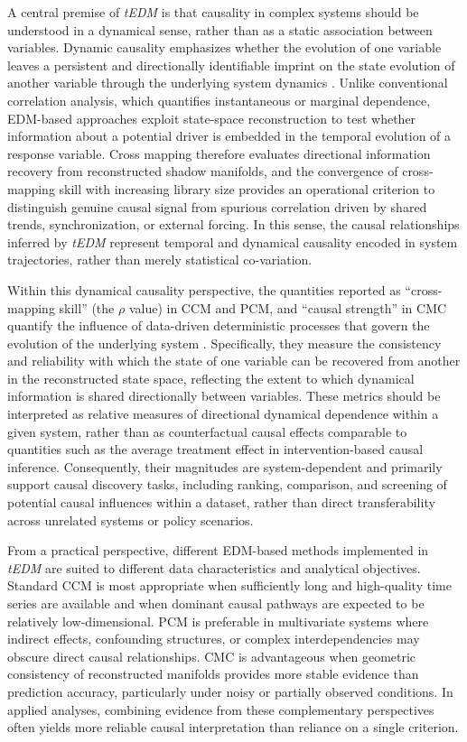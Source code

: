 \documentclass[authoryear,preprint,review,12pt]{elsarticle}
\begin{document}
A central premise of \textit{tEDM} is that causality in complex systems should be understood in a dynamical sense, rather than as a static association between variables. Dynamic causality emphasizes whether the evolution of one variable leaves a persistent and directionally identifiable imprint on the state evolution of another variable through the underlying system dynamics \citep{sugihara2012ccm,harnack2017separability}. Unlike conventional correlation analysis, which quantifies instantaneous or marginal dependence, EDM-based approaches exploit state-space reconstruction to test whether information about a potential driver is embedded in the temporal evolution of a response variable. Cross mapping therefore evaluates directional information recovery from reconstructed shadow manifolds, and the convergence of cross-mapping skill with increasing library size provides an operational criterion to distinguish genuine causal signal from spurious correlation driven by shared trends, synchronization, or external forcing. In this sense, the causal relationships inferred by \textit{tEDM} represent temporal and dynamical causality encoded in system trajectories, rather than merely statistical co-variation.

Within this dynamical causality perspective, the quantities reported as ``cross-mapping skill'' (the $\rho$ value) in CCM and PCM, and ``causal strength'' in CMC quantify the influence of data-driven deterministic processes that govern the evolution of the underlying system \citep{sugihara2012ccm,leng2020pcm,tao2023cmc}. Specifically, they measure the consistency and reliability with which the state of one variable can be recovered from another in the reconstructed state space, reflecting the extent to which dynamical information is shared directionally between variables. These metrics should be interpreted as relative measures of directional dynamical dependence within a given system, rather than as counterfactual causal effects comparable to quantities such as the average treatment effect in intervention-based causal inference. Consequently, their magnitudes are system-dependent and primarily support causal discovery tasks, including ranking, comparison, and screening of potential causal influences within a dataset, rather than direct transferability across unrelated systems or policy scenarios.

From a practical perspective, different EDM-based methods implemented in \textit{tEDM} are suited to different data characteristics and analytical objectives. Standard CCM is most appropriate when sufficiently long and high-quality time series are available and when dominant causal pathways are expected to be relatively low-dimensional. PCM is preferable in multivariate systems where indirect effects, confounding structures, or complex interdependencies may obscure direct causal relationships. CMC is advantageous when geometric consistency of reconstructed manifolds provides more stable evidence than prediction accuracy, particularly under noisy or partially observed conditions. In applied analyses, combining evidence from these complementary perspectives often yields more reliable causal interpretation than reliance on a single criterion.
\end{document}
